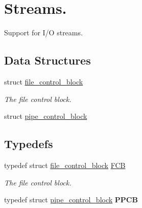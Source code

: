 \hypertarget{group__streams}{}\section{Streams.}
\label{group__streams}


Support for I/O streams.  


\subsection*{Data Structures}
\begin{DoxyCompactItemize}
\item 
struct \hyperlink{structfile__control__block}{file\+\_\+control\+\_\+block}
\begin{DoxyCompactList}\small\item\em The file control block. \end{DoxyCompactList}\item 
struct \hyperlink{structpipe__control__block}{pipe\+\_\+control\+\_\+block}
\end{DoxyCompactItemize}
\subsection*{Typedefs}
\begin{DoxyCompactItemize}
\item 
typedef struct \hyperlink{structfile__control__block}{file\+\_\+control\+\_\+block} \hyperlink{group__streams_ga0c7e751afb9d6cadebf070961804d400}{F\+CB}
\begin{DoxyCompactList}\small\item\em The file control block. \end{DoxyCompactList}\item 
typedef struct \hyperlink{structpipe__control__block}{pipe\+\_\+control\+\_\+block} {\bfseries P\+P\+CB}\hypertarget{group__streams_gaa8ce2904979c3c4ceb603f4af64d943c}{}\label{group__streams_gaa8ce2904979c3c4ceb603f4af64d943c}

\end{DoxyCompactItemize}
